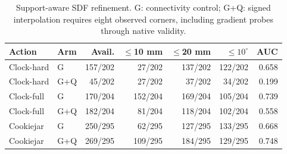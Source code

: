 \begin{table}[t]\centering\scriptsize
\caption{Support-aware SDF refinement. G: connectivity control; G+Q: signed interpolation requires eight observed corners, including gradient probes through native validity.}
\label{tab:supported-sdf}
\begin{tabular}{llrrrrr}\toprule
Action & Arm & Avail. & $\leq$10 mm & $\leq$20 mm & $\leq10^\circ$ & AUC\\\midrule
Clock-hard & G & 157/202 & 27/202 & 137/202 & 122/202 & 0.658\\
Clock-hard & G+Q & 45/202 & 27/202 & 37/202 & 34/202 & 0.199\\
Clock-full & G & 170/204 & 152/204 & 169/204 & 105/204 & 0.739\\
Clock-full & G+Q & 182/204 & 81/204 & 118/204 & 102/204 & 0.558\\
Cookiejar & G & 250/295 & 62/295 & 127/295 & 133/295 & 0.668\\
Cookiejar & G+Q & 269/295 & 109/295 & 184/295 & 129/295 & 0.748\\
\bottomrule\end{tabular}\end{table}
